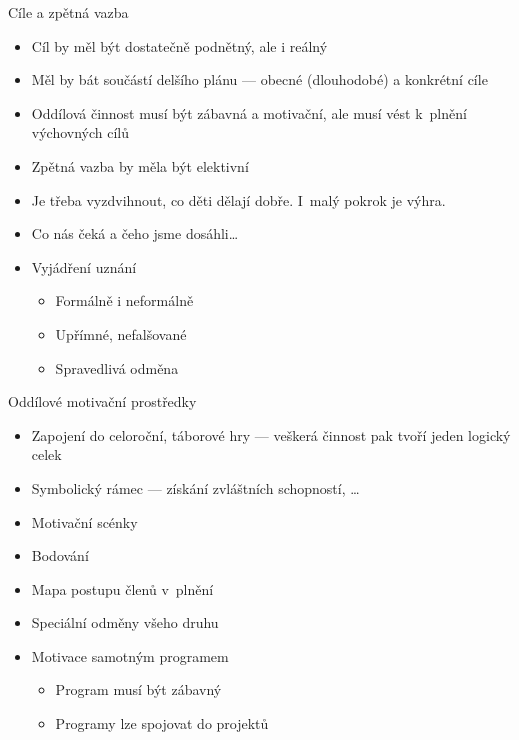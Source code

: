 \documentclass[compress,xelatex,xcolor=dvipsnames,hyperref={pdfpagelabels=false},print]{beamer}
\begin{document}
\begin{frame}{Cíle a zpětná vazba}
\begin{multicols}{2}
\begin{itemize}
\item Cíl by měl být dostatečně podnětný, ale i reálný
\item Měl by bát součástí delšího plánu --- obecné (dlouhodobé) a konkrétní cíle
\item Oddílová činnost musí být zábavná a motivační, ale musí vést k~plnění výchovných cílů
\end{itemize}
\columnbreak
\begin{itemize}
\item Zpětná vazba by měla být elektivní
\item Je třeba vyzdvihnout, co děti dělají dobře. I~malý pokrok je výhra.
\item Co nás čeká a čeho jsme dosáhli\ldots
\item Vyjádření uznání
 \begin{itemize}
 \item Formálně i neformálně
 \item Upřímné, nefalšované
 \item Spravedlivá odměna
 \end{itemize}
\end{itemize}
\end{multicols}
\end{frame}

\begin{frame}{Oddílové motivační prostředky}
\begin{itemize}
\item Zapojení do celoroční, táborové hry --- veškerá činnost pak tvoří jeden logický celek
\item Symbolický rámec --- získání zvláštních schopností, \ldots
\item Motivační scénky
\item Bodování
\item Mapa postupu členů v~plnění
\item Speciální odměny všeho druhu
\item Motivace samotným programem
 \begin{itemize}
 \item Program musí být zábavný
 \item Programy lze spojovat do projektů
 \end{itemize}
\end{itemize}
\end{frame}
\end{document}
